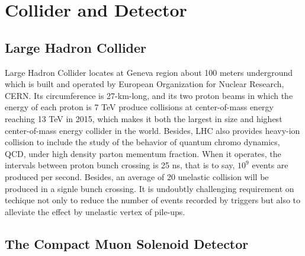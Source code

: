 
\chapter{Collider and Detector} \label{chap:2}

\section{Large Hadron Collider}%
Large Hadron Collider locates at Geneva region about 100 meters underground which is built and operated by European Organization for Nuclear Research, CERN. 
Its circumference is 27-km-long, and its two proton beams in which the energy of each proton is 7 TeV produce collisions at center-of-mass energy reaching 13 TeV in 2015, 
which makes it both the largest in size and highest center-of-mass energy collider in the world.
Besides, LHC also provides heavy-ion collision to include the study of the behavior of quantum chromo dynamics, QCD, under high density parton mementum fraction. 
When it operates, the intervals between proton bunch crossing is 25 ns, that is to say,  $10^9$ events are produced per second. 
Besides, an average of 20 unelastic collision will be produced in a signle bunch crossing.
It is undoubtly challenging requirement on techique not only to reduce the number of events recorded by triggers but also to alleviate the effect by unelastic vertex of pile-ups.

\section{The Compact Muon Solenoid Detector}

